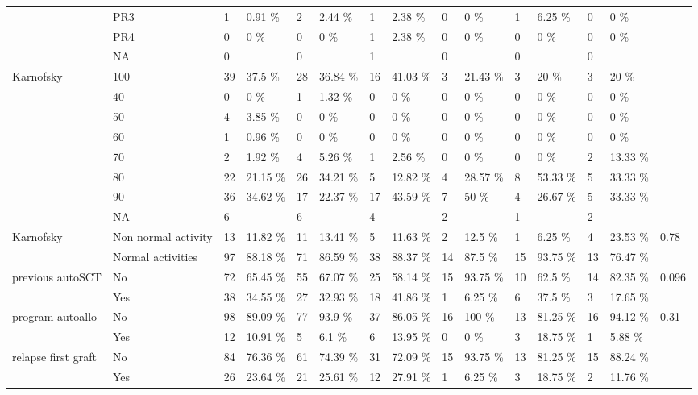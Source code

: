 \documentclass[a4paper,11pt] {article}
\begin{document}
\begin{landscape}
\begin{longtable}{lllllllllllllll}
   & PR3 & 1 & 0.91 \% & 2 & 2.44 \% & 1 & 2.38 \% & 0 & 0 \% & 1 & 6.25 \% & 0 & 0 \% &  \\ 
   & PR4 & 0 & 0 \% & 0 & 0 \% & 1 & 2.38 \% & 0 & 0 \% & 0 & 0 \% & 0 & 0 \% &  \\ 
   & NA & 0 &  & 0 &  & 1 &  & 0 &  & 0 &  & 0 &  &  \\ 
  Karnofsky & 100 & 39 & 37.5 \% & 28 & 36.84 \% & 16 & 41.03 \% & 3 & 21.43 \% & 3 & 20 \% & 3 & 20 \% &  \\ 
   & 40 & 0 & 0 \% & 1 & 1.32 \% & 0 & 0 \% & 0 & 0 \% & 0 & 0 \% & 0 & 0 \% &  \\ 
   & 50 & 4 & 3.85 \% & 0 & 0 \% & 0 & 0 \% & 0 & 0 \% & 0 & 0 \% & 0 & 0 \% &  \\ 
   & 60 & 1 & 0.96 \% & 0 & 0 \% & 0 & 0 \% & 0 & 0 \% & 0 & 0 \% & 0 & 0 \% &  \\ 
   & 70 & 2 & 1.92 \% & 4 & 5.26 \% & 1 & 2.56 \% & 0 & 0 \% & 0 & 0 \% & 2 & 13.33 \% &  \\ 
   & 80 & 22 & 21.15 \% & 26 & 34.21 \% & 5 & 12.82 \% & 4 & 28.57 \% & 8 & 53.33 \% & 5 & 33.33 \% &  \\ 
   & 90 & 36 & 34.62 \% & 17 & 22.37 \% & 17 & 43.59 \% & 7 & 50 \% & 4 & 26.67 \% & 5 & 33.33 \% &  \\ 
   & NA & 6 &  & 6 &  & 4 &  & 2 &  & 1 &  & 2 &  &  \\ 
  Karnofsky & Non normal activity & 13 & 11.82 \% & 11 & 13.41 \% & 5 & 11.63 \% & 2 & 12.5 \% & 1 & 6.25 \% & 4 & 23.53 \% & 0.78 \\ 
   & Normal activities & 97 & 88.18 \% & 71 & 86.59 \% & 38 & 88.37 \% & 14 & 87.5 \% & 15 & 93.75 \% & 13 & 76.47 \% &  \\ 
  previous autoSCT & No & 72 & 65.45 \% & 55 & 67.07 \% & 25 & 58.14 \% & 15 & 93.75 \% & 10 & 62.5 \% & 14 & 82.35 \% & 0.096 \\ 
   & Yes & 38 & 34.55 \% & 27 & 32.93 \% & 18 & 41.86 \% & 1 & 6.25 \% & 6 & 37.5 \% & 3 & 17.65 \% &  \\ 
  program autoallo & No & 98 & 89.09 \% & 77 & 93.9 \% & 37 & 86.05 \% & 16 & 100 \% & 13 & 81.25 \% & 16 & 94.12 \% & 0.31 \\ 
   & Yes & 12 & 10.91 \% & 5 & 6.1 \% & 6 & 13.95 \% & 0 & 0 \% & 3 & 18.75 \% & 1 & 5.88 \% &  \\ 
  relapse first graft & No & 84 & 76.36 \% & 61 & 74.39 \% & 31 & 72.09 \% & 15 & 93.75 \% & 13 & 81.25 \% & 15 & 88.24 \% &  \\ 
   & Yes & 26 & 23.64 \% & 21 & 25.61 \% & 12 & 27.91 \% & 1 & 6.25 \% & 3 & 18.75 \% & 2 & 11.76 \% &  \\ 

\end{longtable}
\end{landscape}
\end{document}
